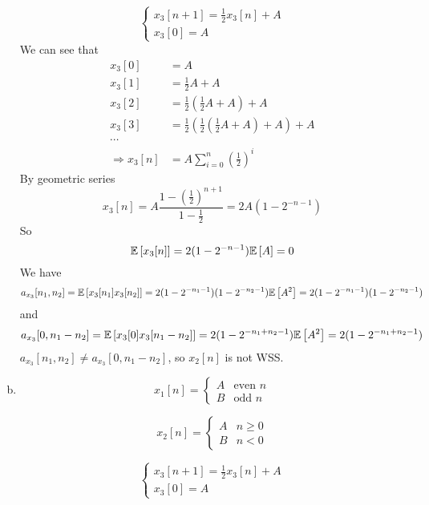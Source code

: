 \begin{enumerate}[(a)]
\[\begin{cases}x_3[n+1] = \frac{1}{2}x_3[n] + A \\ x_3[0] = A \end{cases}\]
We can see that
\begin{align*}
	x_3[0] &= A \\
	x_3[1] &= \frac{1}{2}A + A \\
	x_3[2] &= \frac{1}{2}\left(\frac{1}{2}A + A\right) + A \\
	x_3[3] &= \frac{1}{2}\left(\frac{1}{2}\left(\frac{1}{2}A + A\right) + A\right) + A \\
	\cdots\\
	\Rightarrow x_3[n] &= A \sum_{i=0}^{n}\left(\frac{1}{2}\right)^i
\end{align*}
By geometric series
\[x_3[n] = A \frac{1-\left(\frac{1}{2}\right)^{n+1}}{1 - \frac{1}{2}} = 2A(1 - 2^{-n-1})\]
So
\[\mathbb{E} \left[ x_3[n] \right] = 2(1-2^{-n-1}) \mathbb{E} \left[ A \right] = 0\]
We have
\[a_{x_3}[n_1,n_2] = \mathbb{E} \left[ x_3[n_1]x_3[n_2] \right] = 2(1-2^{-n_1-1})(1-2^{-n_2-1})\mathbb{E} \left[ A^2 \right] = 2(1-2^{-n_1-1})(1-2^{-n_2-1})\]
and
\[a_{x_3}[0,n_1-n_2] = \mathbb{E} \left[ x_3[0]x_3[n_1-n_2] \right] = 2(1-2^{-n_1+n_2-1})\mathbb{E} \left[ A^2 \right] = 2(1-2^{-n_1+n_2-1})\]
$a_{x_3}[n_1,n_2] \neq a_{x_3}[0,n_1-n_2]$, so $x_2[n]$ is not WSS.

\item
\[x_1[n] = \begin{cases}A & \text{even } n \\ B & \text{odd } n \end{cases}\]

\[x_2[n] = \begin{cases}A & n \geq 0 \\ B & n < 0 \end{cases}\]

\[\begin{cases}x_3[n+1] = \frac{1}{2}x_3[n] + A \\ x_3[0] = A \end{cases}\]
\end{enumerate}